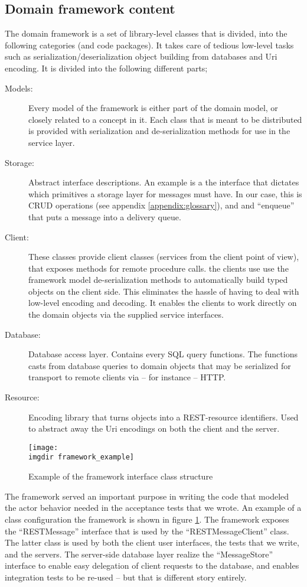 \subsection{Domain framework content}
\label{ssec:openreception-framework-content}
\noindent
The domain framework is a set of library-level classes that is divided, into the following categories (and code packages). It takes care of tedious low-level tasks such as serialization/deserialization object building from databases and Uri encoding. It is divided into the following different parts;
\begin{description}
  \item[Models:] Every model of the framework is either part of the domain model, or closely related to a concept in it. Each class that is meant to be distributed is provided with serialization and de-serialization methods for use in the service layer.
  \item[Storage:] Abstract interface descriptions. An example is a the interface that dictates which primitives a storage layer for messages must have. In our case, this is CRUD operations (see appendix \ref{appendix:glossary}), and and ``enqueue'' that puts a message into a delivery queue.
  \item[Client:] These classes provide client classes (services from the client point of view), that exposes methods for remote procedure calls. the clients use  use the framework model de-serialization methods to automatically build typed objects on the client side. This eliminates the hassle of having to deal with low-level encoding and decoding. It enables the clients to work directly on the domain objects via the supplied service interfaces.
  \item[Database:] Database access layer. Contains every SQL query functions. The functions casts from database queries to domain objects that may be serialized for transport to remote clients via -- for instance -- HTTP.
  \item[Resource:] Encoding library that turns objects into a REST-resource identifiers. Used to abstract away the Uri encodings on both the client and the server.
\end{description}
\begin{figure}[!htbp]
\texttt{[image: \\imgdir framework\_example]}
\centering
\caption{Example of the framework interface class structure}
\label{fig:framework_example}
\end{figure}
\noindent The framework served an important purpose in writing the code that modeled the actor behavior needed in the acceptance tests that we wrote. An example of a class configuration the framework is shown in figure \ref{fig:framework_example}. The framework exposes the ``RESTMessage'' interface that is used by the ``RESTMessageClient'' class. The latter class is used by both the client user interfaces, the tests that we write, and the servers. The server-side database layer realize the ``MessageStore'' interface to enable easy delegation of client requests to the database, and enables integration tests to be re-used -- but that is different story entirely.

